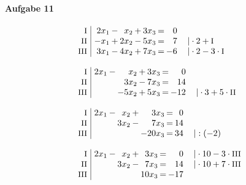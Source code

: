 \paragraph{Aufgabe 11}
\begin{equation*}
\begin{array}{l}
\setlength{\arraycolsep}{1pt}
\begin{array}{r|rcrcrcrl}
    \text{\small I } &\; 2x_{1} & - &  x_{2} & + & 3x_{3} & = &  0 &                                    \\
   \text{\small II } &\; -x_{1} & + & 2x_{2} & - & 5x_{3} & = &  7 & \quad|\cdot2+\text{\small I}       \\
  \text{\small III } &\; 3x_{1} & - & 4x_{2} & + & 7x_{3} & = & -6 & \quad|\cdot2-3\cdot\text{\small I}   
\end{array}
\\ \\
\setlength{\arraycolsep}{1pt}
\begin{array}{r|rcrcrcrl}
    \text{\small I } &\; 2x_{1} & - &   x_{2} & + & 3x_{3} & = &   0 &                                     \\
   \text{\small II } &\;        &   &  3x_{2} & - & 7x_{3} & = &  14 &                                     \\
  \text{\small III } &\;        &   & -5x_{2} & + & 5x_{3} & = & -12 & \quad|\cdot3+5\cdot\text{\small II}   
\end{array}
\\ \\
\setlength{\arraycolsep}{1pt}
\begin{array}{r|rcrcrcrl}
    \text{\small I } &\; 2x_{1} & - &  x_{2} & + &   3x_{3} & = &  0 &             \\
   \text{\small II } &\;        &   & 3x_{2} & - &   7x_{3} & = & 14 &             \\
  \text{\small III } &\;        &   &        &   & -20x_{3} & = & 34 & \quad|:(-2)   
\end{array}
\\ \\
\setlength{\arraycolsep}{1pt}
\begin{array}{r|rcrcrcrl}
    \text{\small I } &\; 2x_{1} & - &  x_{2} & + &  3x_{3} & = &   0 & \quad|\cdot10-3\cdot\text{\small III} \\
   \text{\small II } &\;        &   & 3x_{2} & - &  7x_{3} & = &  14 & \quad|\cdot10+7\cdot\text{\small III} \\
  \text{\small III } &\;        &   &        &   & 10x_{3} & = & -17 &                                         

\end{array}
\end{array}
\end{equation*}

